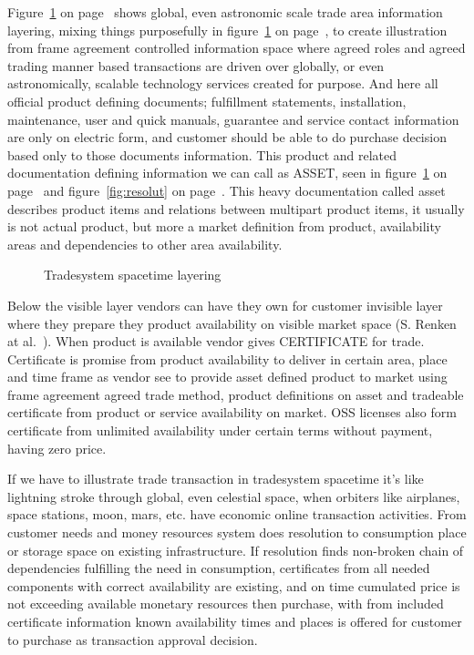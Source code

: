 Figure~\ref{fig:layering} on page~\pageref{fig:layering} shows global, even
astronomic scale trade area information layering, mixing things purposefully
in figure~\ref{fig:layering} on page~\pageref{fig:layering}, to create
illustration from frame agreement controlled information space where agreed
roles and agreed trading manner based transactions are driven over globally,
or even astronomically, scalable technology services created for purpose. And
here all official product defining documents; fulfillment statements,
installation, maintenance, user and quick manuals, guarantee and service
contact information are only on electric form, and customer should be able to
do purchase decision based only to those documents information. This product
and related documentation defining information we can call as ASSET, seen in
figure~\ref{fig:layering} on page~\pageref{fig:layering} and
figure~\ref{fig:resolut} on page~\pageref{fig:resolut}. This heavy
documentation called asset describes product items and relations between
multipart product items, it usually is not actual product, but more a market
definition from product, availability areas and dependencies to other area
availability.

\begin{figure} %
 \begin{center}
  \caption{Tradesystem spacetime layering}\label{fig:layering}
 \end{center}
\end{figure}

Below the visible layer vendors can have they own for customer invisible layer
where they prepare they product availability on visible market space (S.
Renken at al.~\cite{RenkenNRWC2022}). When product is available vendor gives
CERTIFICATE for trade. Certificate is promise from product availability to
deliver in certain area, place and time frame as vendor see to provide asset
defined product to market using frame agreement agreed trade method, product
definitions on asset and tradeable certificate from product or service
availability on market. OSS licenses also form certificate from unlimited
availability under certain terms without payment, having zero price.

If we have to illustrate trade transaction in tradesystem spacetime it's like
lightning stroke\allowbreak\cite{LightningStrike}
through global, even celestial space, when orbiters like
airplanes, space stations, moon, mars, etc. have economic online transaction
activities\allowbreak\cite{LTEonMoon}. From customer needs and money resources
system does resolution to consumption place or storage space on existing
infrastructure. If resolution finds non-broken chain of dependencies
fulfilling the need in consumption, certificates from all needed components
with correct availability are existing, and on time cumulated price is not
exceeding available monetary resources then purchase, with from included
certificate information known availability times and places is offered for
customer to purchase as transaction approval decision.

